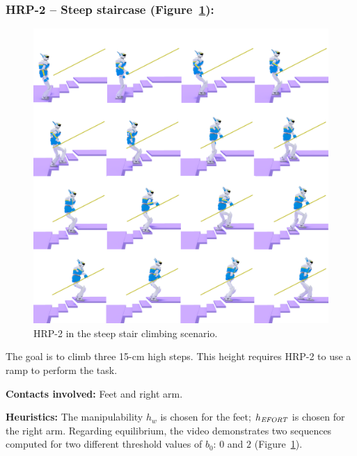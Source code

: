 \subsubsection{HRP-2 -- Steep staircase (Figure~\ref{fig:stair_robust}):}

\begin{figure}
  \centering
  \includegraphics[width=1\linewidth]{figures/stair}
  \caption{
           HRP-2 in the steep stair climbing scenario. }
		   \label{fig:stair_robust}
\end{figure}

The goal is to climb three 15-cm high steps. This height requires HRP-2 to use a ramp to perform the task.

\noindent\textbf{Contacts involved:} Feet and right arm.

\noindent\textbf{Heuristics:} The manipulability $h_w$ is chosen for the feet; $h_{\textrm{\it EFORT}}$ is chosen for the right arm.
Regarding equilibrium, the video demonstrates two sequences computed for two different threshold values of $b_0$: $0$ and $2$ (Figure~\ref{fig:stair_robust}). 

